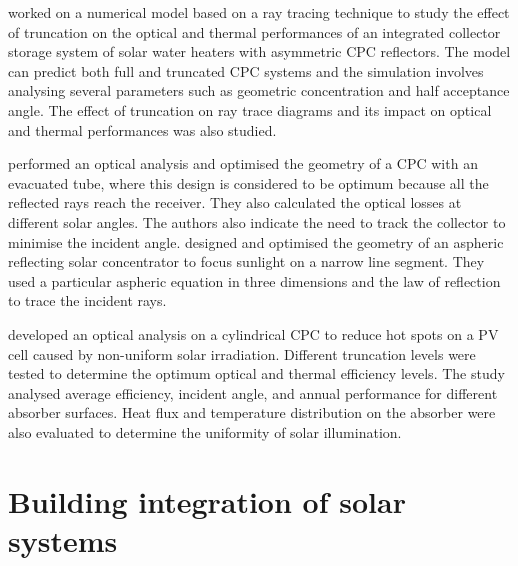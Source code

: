 \citet{Benrejeb2016} worked on a numerical model based on a ray tracing technique to study the effect of truncation on the optical and thermal performances of an integrated collector storage system of solar water heaters with asymmetric CPC reflectors. The model can predict both full and truncated CPC systems and the simulation involves analysing several parameters such as geometric concentration and half acceptance angle. The effect of truncation on ray trace diagrams and its impact on optical and thermal performances was also studied.

\citet{Bellos2016} performed an optical analysis and optimised the geometry of a CPC with an evacuated tube, where this design is considered to be optimum because all the reflected rays reach the receiver. They also calculated the optical losses at different solar angles. The authors also indicate the need to track the collector to minimise the incident angle. \citet{Qin2013} designed and optimised the geometry of an aspheric reflecting solar concentrator to focus sunlight on a narrow line segment. They used a particular aspheric equation in three dimensions and the law of reflection to trace the incident rays.

\citet{Ustaoglu2016} developed an optical analysis on a cylindrical CPC to reduce hot spots on a PV cell caused by non-uniform solar irradiation. Different truncation levels were tested to determine the optimum optical and thermal efficiency levels. The study analysed average efficiency, incident angle, and annual performance for different absorber surfaces. Heat flux and temperature distribution on the absorber were also evaluated to determine the uniformity of solar illumination.




\section{Building integration of solar systems}




	
